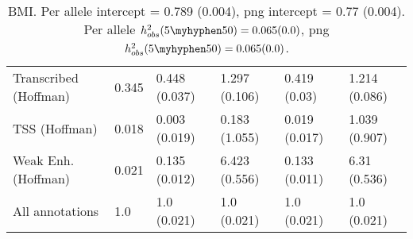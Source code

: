\documentclass[11pt]{article}
\begin{document}
\begin{table}[H]
\begin{center}
\begin{tabular}{l|lllll}
Transcribed (Hoffman)  &  0.345 & 0.448 (0.037) & 1.297 (0.106) &
0.419 (0.03) & 1.214 (0.086) \\
TSS (Hoffman)  &  0.018 & 0.003 (0.019) & 0.183 (1.055) &
0.019 (0.017) & 1.039 (0.907) \\
Weak Enh. (Hoffman)  &  0.021 & 0.135 (0.012) & 6.423 (0.556) &
0.133 (0.011) & 6.31 (0.536) \\
All annotations  &  1.0 & 1.0 (0.021) & 1.0 (0.021) &
1.0 (0.021) & 1.0 (0.021) \\
\end{tabular}
\caption{BMI.
Per allele intercept = 0.789 (0.004),
png intercept = 0.77 (0.004).
Per allele $h^2_{obs}(5\myhyphen50) = 0.065 (0.0)$,
png $h^2_{obs}(5\myhyphen50) = 0.065 (0.0)$.}
\end{center}
\end{table}
\end{document}

